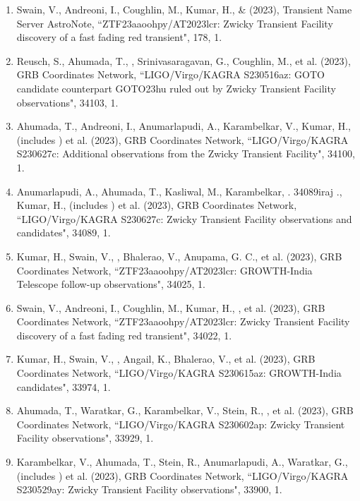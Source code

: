 \begin{enumerate}[leftmargin=*]
\item Swain, V., Andreoni, I., Coughlin, M., Kumar, H., \& \me (2023), Transient Name Server AstroNote, {``ZTF23aaoohpy/AT2023lcr: Zwicky Transient Facility discovery of a fast fading red transient"}, 178, 1.

\item Reusch, S., Ahumada, T., \me, Srinivasaragavan, G., Coughlin, M., et al. (2023), GRB Coordinates Network, {``LIGO/Virgo/KAGRA S230516az: GOTO candidate counterpart GOTO23hu ruled out by Zwicky Transient Facility observations"}, 34103, 1.

\item Ahumada, T., Andreoni, I., Anumarlapudi, A., Karambelkar, V., Kumar, H., (includes \me) et al. (2023), GRB Coordinates Network, {``LIGO/Virgo/KAGRA S230627c: Additional observations from the Zwicky Transient Facility"}, 34100, 1.

\item Anumarlapudi, A., Ahumada, T., Kasliwal, M., Karambelkar, . 34089iraj ., Kumar, H., (includes \me) et al. (2023), GRB Coordinates Network, {``LIGO/Virgo/KAGRA S230627c: Zwicky Transient Facility observations and candidates"}, 34089, 1.

\item Kumar, H., Swain, V., \me, Bhalerao, V., Anupama, G. C., et al. (2023), GRB Coordinates Network, {``ZTF23aaoohpy/AT2023lcr: GROWTH-India Telescope follow-up observations"}, 34025, 1.

\item Swain, V., Andreoni, I., Coughlin, M., Kumar, H., \me, et al. (2023), GRB Coordinates Network, {``ZTF23aaoohpy/AT2023lcr: Zwicky Transient Facility discovery of a fast fading red transient"}, 34022, 1.

\item Kumar, H., Swain, V., \me, Angail, K., Bhalerao, V., et al. (2023), GRB Coordinates Network, {``LIGO/Virgo/KAGRA S230615az: GROWTH-India candidates"}, 33974, 1.

\item Ahumada, T., Waratkar, G., Karambelkar, V., Stein, R., \me, et al. (2023), GRB Coordinates Network, {``LIGO/Virgo/KAGRA S230602ap: Zwicky Transient Facility observations"}, 33929, 1.

\item Karambelkar, V., Ahumada, T., Stein, R., Anumarlapudi, A., Waratkar, G.,  (includes \me) et al. (2023), GRB Coordinates Network, {``LIGO/Virgo/KAGRA S230529ay: Zwicky Transient Facility observations"}, 33900, 1.


\end{enumerate}
